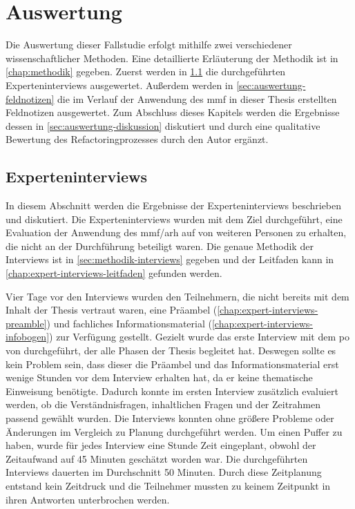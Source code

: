 \chapter{Auswertung}
\label{chap:auswertung}

Die Auswertung dieser Fallstudie erfolgt mithilfe zwei verschiedener wissenschaftlicher Methoden.
Eine detaillierte Erläuterung der Methodik ist in \cref{chap:methodik} gegeben.
Zuerst werden in \cref{sec:auswertung-interviews} die durchgeführten Experteninterviews ausgewertet.
Außerdem werden in \cref{sec:auswertung-feldnotizen} die im Ver\-lauf der Anwendung des \gls{mmf} in dieser Thesis erstellten Feldnotizen ausgewertet.
Zum Abschluss dieses Kapitels werden die Ergebnisse dessen in \cref{sec:auswertung-diskussion} diskutiert und durch eine qualitative Bewertung des Refactoringprozesses durch den Autor ergänzt.

\section{Experteninterviews}
\label{sec:auswertung-interviews}

In diesem Abschnitt werden die Ergebnisse der Experteninterviews beschrieben und diskutiert.
Die Ex\-per\-ten\-inter\-views wurden mit dem Ziel durchgeführt, eine Evaluation der Anwendung des \gls{mmf}/\gls{arh} auf \jf von weiteren Personen zu erhalten, die nicht an der Durchführung beteiligt waren.
Die genaue Methodik der Interviews ist in \cref{sec:methodik-interviews} gegeben und der Leitfaden kann in \cref{chap:expert-interviews-leitfaden} gefunden werden.

Vier Tage vor den Interviews wurden den Teilnehmern, die nicht bereits mit dem Inhalt der Thesis vertraut waren, eine Präambel (\cref{chap:expert-interviews-preamble}) und fachliches Informationsmaterial (\cref{chap:expert-interviews-infobogen}) zur Verfügung gestellt.
Gezielt wurde das erste Interview mit dem \gls{po} von \jf durchgeführt, der alle Phasen der Thesis begleitet hat.
Deswegen sollte es kein Problem sein, dass dieser die Präambel und das Informationsmaterial erst wenige Stunden vor dem Interview erhalten hat, da er keine thematische Einweisung benötigte.
Dadurch konnte im ersten Interview zusätzlich evaluiert werden, ob die Verständnisfragen, inhaltlichen Fragen und der Zeitrahmen passend gewählt wurden.
Die Interviews konnten ohne größere Probleme oder Änderungen im Vergleich zu Planung durchgeführt werden.
Um einen Puffer zu haben, wurde für jedes Interview eine Stunde Zeit eingeplant, obwohl der Zeitaufwand auf 45 Minuten geschätzt worden war.
Die durchgeführten Interviews dauerten im Durchschnitt 50 Minuten.
Durch diese Zeitplanung entstand kein Zeitdruck und die Teilnehmer mussten zu keinem Zeitpunkt in ihren Antworten unterbrochen werden.


